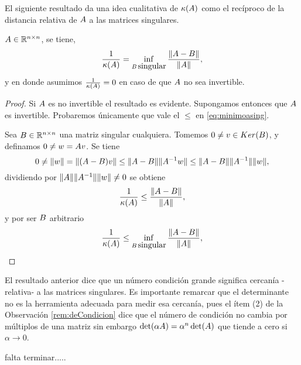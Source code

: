 El siguiente resultado da una idea cualitativa de $\kappa(\Ab)$ como el recíproco de la distancia relativa de $\Ab$ a las matrices singulares.
\begin{teo}
 $\Ab\in \Rnn$, se tiene,
 \begin{equation}
 \label{eq:minimoasing}
\frac{1}{\kappa(\Ab)}=\inf_{\Bb\,  \mbox{singular}} \frac{\|\Ab-\Bb\|}{\|\Ab\|},
 \end{equation}
 y en donde asumimos $\frac{1}{\kappa(\Ab)}=0$ en caso de que $\Ab$ no sea invertible.
 \end{teo}
 \begin{proof}
  Si $\Ab$ es no invertible el resultado es evidente. Supongamos entonces que $\Ab$ es invertible. Probaremos únicamente que vale  el $\le$  en \eqref{eq:minimoasing}.

  Sea $B\in \mathbb R^{n\times n}$ una matriz singular cualquiera. Tomemos $\cero\neq \vb\in Ker(\Bb)$, y definamos $\cero\neq\wb=\Ab\vb$. Se tiene
  $$
  0\neq \|\wb\|=\|(\Ab - \Bb)\vb\|\le \|\Ab-\Bb\|\|\Ab^{-1}\wb\|\le \|\Ab-\Bb\|\|\Ab^{-1}\|\|\wb\|,
  $$
  dividiendo por $\|\Ab\|\|\Ab^{-1}\|\|\wb\|\neq 0$ se obtiene
  $$
\frac{1}{\kappa(\Ab)}\le  \frac{\|\Ab-\Bb\|}{\|\Ab\|},
 $$
 y por ser $\Bb$ arbitrario
 $$
\frac{1}{\kappa(\Ab)}\le \inf_{\Bb\,  \mbox{singular}} \frac{\|\Ab-\Bb\|}{\|\Ab\|},
 $$
 \end{proof}
El resultado anterior dice que un número condición grande significa cercanía -relativa- a las matrices singulares. Es importante remarcar que el determinante  no es la herramienta adecuada para medir esa cercanía, pues el ítem (2) de la Observación \ref{rem:deCondicion} dice que el número de condición no cambia por múltiplos de una matriz sin embargo $\det(\alpha\Ab)=\alpha^n\det(\Ab)$ que tiende a cero si $\alpha\to 0$.


falta terminar.....

